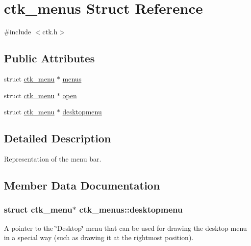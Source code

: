 \hypertarget{structctk__menus}{}\section{ctk\+\_\+menus Struct Reference}
\label{structctk__menus}


{\ttfamily \#include $<$ctk.\+h$>$}

\subsection*{Public Attributes}
\begin{DoxyCompactItemize}
\item 
struct \hyperlink{structctk__menu}{ctk\+\_\+menu} $\ast$ \hyperlink{structctk__menus_a3107c61dcb9ef9256a0a4052c4c21351}{menus}
\item 
struct \hyperlink{structctk__menu}{ctk\+\_\+menu} $\ast$ \hyperlink{structctk__menus_af155f1cd3f427f04670e20f6426d2de6}{open}
\item 
struct \hyperlink{structctk__menu}{ctk\+\_\+menu} $\ast$ \hyperlink{structctk__menus_a2d32d77f05a45c448b6fa8b9b56e7379}{desktopmenu}
\end{DoxyCompactItemize}


\subsection{Detailed Description}
Representation of the menu bar. 

\subsection{Member Data Documentation}
\hypertarget{structctk__menus_a2d32d77f05a45c448b6fa8b9b56e7379}{}
\subsubsection[{desktopmenu}]{\setlength{\rightskip}{0pt plus 5cm}struct {\bf ctk\+\_\+menu}$\ast$ ctk\+\_\+menus\+::desktopmenu}\label{structctk__menus_a2d32d77f05a45c448b6fa8b9b56e7379}
A pointer to the \char`\"{}\+Desktop\char`\"{} menu that can be used for drawing the desktop menu in a special way (such as drawing it at the rightmost position). \hypertarget{structctk__menus_a3107c61dcb9ef9256a0a4052c4c21351}{}
